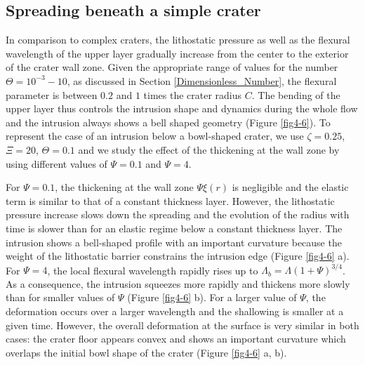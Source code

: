 \begin{article}
	\subsection{Spreading beneath a simple crater}
	\label{SimpleCrater}
		
        In comparison to complex  craters, the lithostatic pressure as
        well as the  flexural wavelength of the  upper layer gradually
        increase from  the center to  the exterior of the  crater wall
        zone. Given  the appropriate  range of  values for  the number
        $\Theta=10^{-3}-10$,      as     discussed      in     Section
        \ref{Dimensionless_Number}, the flexural  parameter is between
        $0.2$ and $1$ times the crater  radius $C$. The bending of the
        upper  layer thus  controls the  intrusion shape  and dynamics
        during the  whole flow and  the intrusion always shows  a bell
        shaped geometry  (Figure \ref{fig4-6}). To represent  the case
        of   an  intrusion   below  a   bowl-shaped  crater,   we  use
        $\zeta=0.25$, $\Xi=20$, $ \Theta=0.1$  and we study the effect
        of the thickening  at the wall zone by  using different values
        of $\Psi=0.1$ and $\Psi=4$.
		
        For $\Psi=0.1$, the thickening at the wall zone $\Psi \xi(r) $
        is negligible  and the elastic  term is  similar to that  of a
        constant  thickness layer.  However, the  lithostatic pressure
        increase slows  down the  spreading and  the evolution  of the
        radius with time is slower than  for an elastic regime below a
        constant thickness  layer. The  intrusion shows  a bell-shaped
        profile with an important curvature  because the weight of the
        lithostatic  barrier  constrains  the intrusion  edge  (Figure
        \ref{fig4-6} a).  For $\Psi=4$,  the local flexural wavelength
        rapidly rises up  to $\Lambda_{b}=\Lambda(1+\Psi)^{3/4}$. As a
        consequence, the intrusion squeezes  more rapidly and thickens
        more  slowly  than  for   smaller  values  of  $\Psi$  (Figure
        \ref{fig4-6} b). For a larger value of $\Psi$, the deformation
        occurs over a larger wavelength  and the shallowing is smaller
        at  a given  time.  However, the  overall  deformation at  the
        surface  is  very similar  in  both  cases: the  crater  floor
        appears convex and shows an important curvature which overlaps
        the initial bowl  shape of the crater  (Figure \ref{fig4-6} a,
        b).
	 

\end{article}
